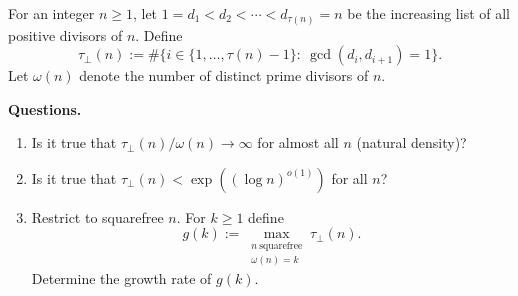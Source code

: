 \smallskip
\noindent
For an integer $n\ge 1$, let $1=d_1<d_2<\cdots<d_{\tau(n)}=n$ be the increasing list of all positive divisors of $n$.
Define
\[
\tau_\perp(n):=\#\{i\in\{1,\dots,\tau(n)-1\}:\ \gcd(d_i,d_{i+1})=1\}.
\]
Let $\omega(n)$ denote the number of distinct prime divisors of $n$.

\smallskip
\noindent
\textbf{Questions.}
\begin{enumerate}
\item Is it true that $\tau_\perp(n)/\omega(n)\to\infty$ for almost all $n$ (natural density)?
\item Is it true that $\tau_\perp(n)<\exp((\log n)^{o(1)})$ for all $n$?
\item Restrict to squarefree $n$. For $k\ge 1$ define
\[
 g(k):=\max_{\substack{n\ \text{squarefree}\\ \omega(n)=k}} \tau_\perp(n).
\]
Determine the growth rate of $g(k)$.
\end{enumerate}
